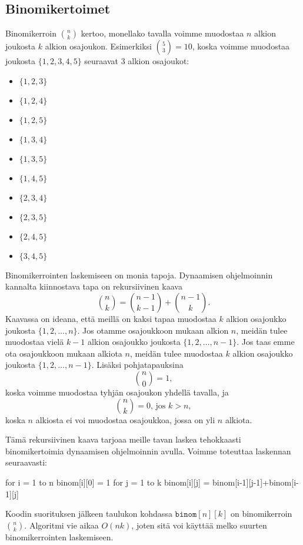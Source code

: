 \subsection{Binomikertoimet}

Binomikerroin $\binom{n}{k}$ kertoo, monellako tavalla voimme
muodostaa $n$ alkion joukosta $k$ alkion osajoukon.
Esimerkiksi $\binom{5}{3}=10$, koska voimme muodostaa
joukosta $\{1,2,3,4,5\}$ seuraavat 3 alkion osajoukot:

\begin{multicols}{3}
\begin{itemize}
\item $\{1,2,3\}$
\item $\{1,2,4\}$
\item $\{1,2,5\}$
\item $\{1,3,4\}$
\item $\{1,3,5\}$
\item $\{1,4,5\}$
\item $\{2,3,4\}$
\item $\{2,3,5\}$
\item $\{2,4,5\}$
\item $\{3,4,5\}$
\end{itemize}
\end{multicols}

Binomikerrointen laskemiseen on monia tapoja.
Dynaamisen ohjelmoinnin kannalta kiinnostava tapa on rekursiivinen kaava
\[\binom{n}{k} = \binom{n-1}{k-1} + \binom{n-1}{k}.\]
Kaavassa on ideana, että meillä on kaksi tapaa muodostaa $k$ alkion osajoukko
joukosta $\{1,2,\dots,n\}$.
Jos otamme osajoukkoon mukaan alkion $n$, meidän tulee muodostaa
vielä $k-1$ alkion osajoukko joukosta $\{1,2,\dots,n-1\}$.
Jos taas emme ota osajoukkoon mukaan alkiota $n$, meidän tulee muodostaa
$k$ alkion osajoukko joukosta $\{1,2,\dots,n-1\}$.
Lisäksi pohjatapauksina
\[ \binom{n}{0} = 1,\]
koska voimme muodostaa tyhjän osajoukon yhdellä tavalla, ja
\[ \binom{n}{k} = 0,\,\textrm{jos $k>n$},\]
koska $n$ alkiosta ei voi muodostaa osajoukkoa, jossa on yli $n$ alkiota.

Tämä rekursiivinen kaava tarjoaa meille tavan laskea tehokkaasti
binomikertoimia dynaamisen ohjelmoinnin avulla.
Voimme toteuttaa laskennan seuraavasti:

\begin{code}
for i = 1 to n
    binom[i][0] = 1
    for j = 1 to k
        binom[i][j] = binom[i-1][j-1]+binom[i-1][j]
\end{code}

Koodin suorituksen jälkeen taulukon kohdassa
$\texttt{binom}[n][k]$ on binomikerroin $\binom{n}{k}$.
Algoritmi vie aikaa $O(nk)$, joten sitä voi käyttää
melko suurten binomikerrointen laskemiseen.